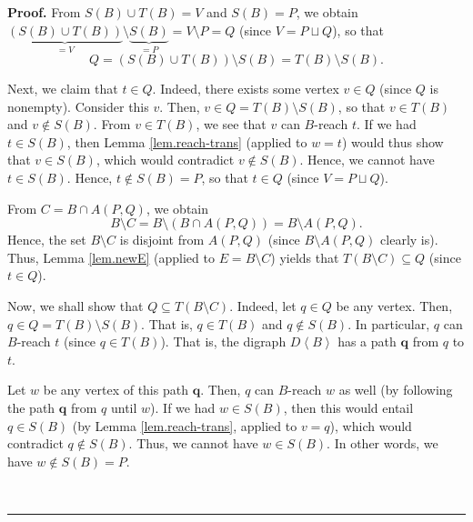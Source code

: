 \documentclass[numbers=enddot,12pt,final,onecolumn,notitlepage]{scrartcl}%
\theoremstyle{definition}
\newenvironment{proof}[1][Proof]{\noindent\textbf{#1.} }{\ \rule{0.5em}{0.5em}}
\theoremstyle{plainsl}
\begin{document}
\begin{proof}
From $S\left(  B\right)  \cup T\left(  B\right)  =V$ and $S\left(  B\right)
=P$, we obtain $\underbrace{\left(  S\left(  B\right)  \cup T\left(  B\right)
\right)  }_{=V}\setminus\underbrace{S\left(  B\right)  }_{=P}=V\setminus P=Q$
(since $V=P\sqcup Q$), so that%
\[
Q=\left(  S\left(  B\right)  \cup T\left(  B\right)  \right)  \setminus
S\left(  B\right)  =T\left(  B\right)  \setminus S\left(  B\right)  .
\]


Next, we claim that $t\in Q$. Indeed, there exists some vertex $v\in Q$ (since
$Q$ is nonempty). Consider this $v$. Then, $v\in Q=T\left(  B\right)
\setminus S\left(  B\right)  $, so that $v\in T\left(  B\right)  $ and
$v\notin S\left(  B\right)  $. From $v\in T\left(  B\right)  $, we see that
$v$ can $B$-reach $t$. If we had $t\in S\left(  B\right)  $, then Lemma
\ref{lem.reach-trans} (applied to $w=t$) would thus show that $v\in S\left(
B\right)  $, which would contradict $v\notin S\left(  B\right)  $. Hence, we
cannot have $t\in S\left(  B\right)  $. Hence, $t\notin S\left(  B\right)
=P$, so that $t\in Q$ (since $V=P\sqcup Q$).

From $C=B\cap A\left(  P,Q\right)  $, we obtain
\begin{equation}
B\setminus C=B\setminus\left(  B\cap A\left(  P,Q\right)  \right)  =B\setminus
A\left(  P,Q\right)  . \label{pf.lem.newD.sm}%
\end{equation}
Hence, the set $B\setminus C$ is disjoint from $A\left(  P,Q\right)  $ (since
$B\setminus A\left(  P,Q\right)  $ clearly is). Thus, Lemma \ref{lem.newE}
(applied to $E=B\setminus C$) yields that $T\left(  B\setminus C\right)
\subseteq Q$ (since $t\in Q$).

Now, we shall show that $Q\subseteq T\left(  B\setminus C\right)  $. Indeed,
let $q\in Q$ be any vertex. Then, $q\in Q=T\left(  B\right)  \setminus
S\left(  B\right)  $. That is, $q\in T\left(  B\right)  $ and $q\notin
S\left(  B\right)  $. In particular, $q$ can $B$-reach $t$ (since $q\in
T\left(  B\right)  $). That is, the digraph $D\left\langle B\right\rangle $
has a path $\mathbf{q}$ from $q$ to $t$.

Let $w$ be any vertex of this path $\mathbf{q}$. Then, $q$ can $B$-reach $w$
as well (by following the path $\mathbf{q}$ from $q$ until $w$). If we had
$w\in S\left(  B\right)  $, then this would entail $q\in S\left(  B\right)  $
(by Lemma \ref{lem.reach-trans}, applied to $v=q$), which would contradict
$q\notin S\left(  B\right)  $. Thus, we cannot have $w\in S\left(  B\right)
$. In other words, we have $w\notin S\left(  B\right)  =P$.


\end{proof}
\end{document}
